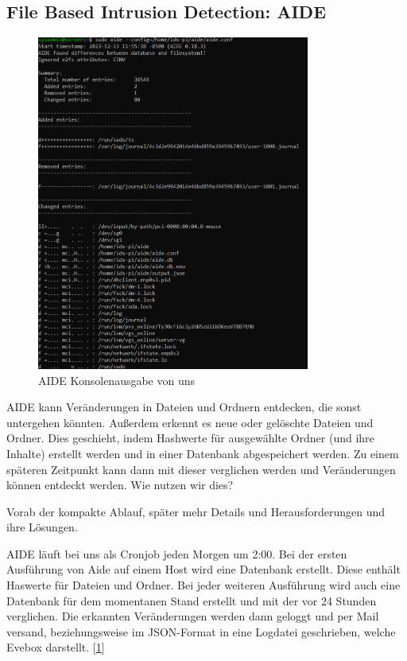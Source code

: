\documentclass{article}
\begin{document}
\subsection{File Based Intrusion Detection: AIDE}
\begin{figure}
    \centering
    \includegraphics[width=0.8\textwidth]{assets/AIDE.png}
    \caption[AIDE Konsolenausgabe]{\label{fig:AIDE}AIDE Konsolenausgabe von uns}
\end{figure}

AIDE kann Veränderungen in Dateien und Ordnern entdecken, die sonst untergehen könnten. Außerdem erkennt es neue oder gelöschte Dateien und Ordner. Dies geschieht, indem Hashwerte für ausgewählte Ordner (und ihre Inhalte) erstellt werden und in einer Datenbank abgespeichert werden. Zu einem späteren Zeitpunkt kann dann mit dieser verglichen werden und Veränderungen können entdeckt werden. Wie nutzen wir dies?

Vorab der kompakte Ablauf, später mehr Details und Herausforderungen und ihre Lösungen.

AIDE läuft bei uns als Cronjob jeden Morgen um 2:00.
Bei der ersten Ausführung von Aide auf einem Host wird eine Datenbank erstellt. Diese enthält Haswerte für Dateien und Ordner. Bei jeder weiteren Ausführung wird auch eine Datenbank für dem momentanen Stand erstellt und mit der vor 24 Stunden verglichen.
Die erkannten Veränderungen werden dann geloggt und per Mail versand, beziehungsweise im JSON-Format in eine Logdatei geschrieben, welche Evebox darstellt. [\ref{fig:AIDE}]
\end{document}
